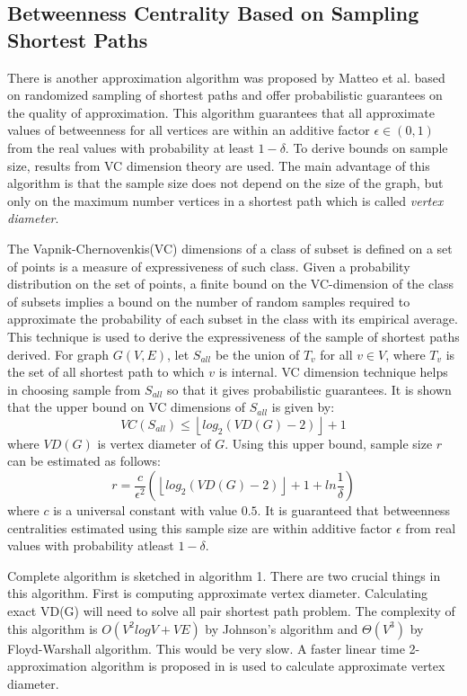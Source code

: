 \documentclass[runningheads,a4paper]{llncs}
\begin{document}
\subsection*{Betweenness Centrality Based on Sampling Shortest Paths}
There  is another approximation algorithm was proposed by Matteo et al. \cite{matteo} based on randomized sampling of shortest paths and offer probabilistic guarantees on the quality of approximation. This algorithm guarantees that all approximate values of betweenness for all vertices are within an additive factor $\epsilon \in (0,1)$ from the real values with probability at least $1-\delta$. To derive bounds on sample size, results from VC dimension theory\cite{vc} are used. The main advantage of this algorithm is that the sample size does not depend on the size of the graph, but only on the maximum number vertices in a shortest path which is called \textit{vertex diameter}.  

The Vapnik-Chernovenkis(VC) dimensions of a class of subset is defined on a set of points is a measure of expressiveness of such class. Given a probability distribution on the set of points, a finite bound on the VC-dimension of the class of subsets implies a bound on the number of random samples required to approximate the probability of each subset in the class with its empirical average. This technique is used to derive the expressiveness of the sample of shortest paths derived. For graph $G(V,E)$, let $S_{all}$ be the union of $T_{v}$ for all $v \in V$, where $T_{v}$ is the set of all shortest path to which $v$ is internal. VC dimension technique helps in choosing sample from $S_{all}$ so that it gives probabilistic guarantees. It is shown that the upper bound on VC dimensions of $S_{all}$ is given by:
$$VC(S_{all}) \leq \left\lfloor{log_{2}(VD(G) - 2)}\right\rfloor + 1$$
where $VD(G)$ is vertex diameter of $G$. Using this upper bound, sample size $r$ can be estimated as follows:
\begin{equation} \label{sample_size_algo}
r = \frac{c}{\epsilon^{2}}(\left\lfloor{log_{2}(VD(G) - 2)}\right\rfloor + 1 + ln\frac{1}{\delta})
\end{equation} 
where $c$ is a universal constant with value $0.5$. It is guaranteed that betweenness centralities estimated using this sample size are within additive factor $\epsilon$ from real values with probability atleast $1-\delta$. 

Complete algorithm is sketched in algorithm 1. There are two crucial things in this algorithm. First is computing approximate vertex diameter. Calculating exact VD(G) will need to solve all pair shortest  path problem. The complexity of this algorithm is $O(V^{2}logV + VE)$ by Johnson's algorithm\cite{johnson} and $\Theta(V^{3})$ by Floyd-Warshall algorithm. This would be very slow. A faster linear time 2-approximation algorithm is proposed in \cite{matteo} is used to calculate approximate vertex diameter. 
\end{document}
